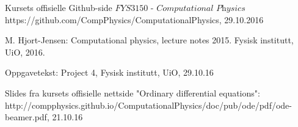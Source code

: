 \documentclass[11pt,a4paper]{article}
\begin{document}

\begin{thebibliography}{9}  

\bibitem{}
  Kursets offisielle Github-side $\textit{FYS3150 - Computational Physics}$
  https://github.com/CompPhysics/ComputationalPhysics,
  29.10.2016  
    
\bibitem{}
   M. Hjort-Jensen: Computational physics, lecture notes 2015. Fysisk institutt, UiO, 2016.

\bibitem{}
   Oppgavetekst: Project 4, Fysisk institutt, UiO, 29.10.16
    
\bibitem{}
  Slides fra kursets offisielle nettside
  "Ordinary differential equations":
  http://compphysics.github.io/ComputationalPhysics/doc/pub/ode/pdf/ode-beamer.pdf, 21.10.16


   
\end{thebibliography}
\end{document}
